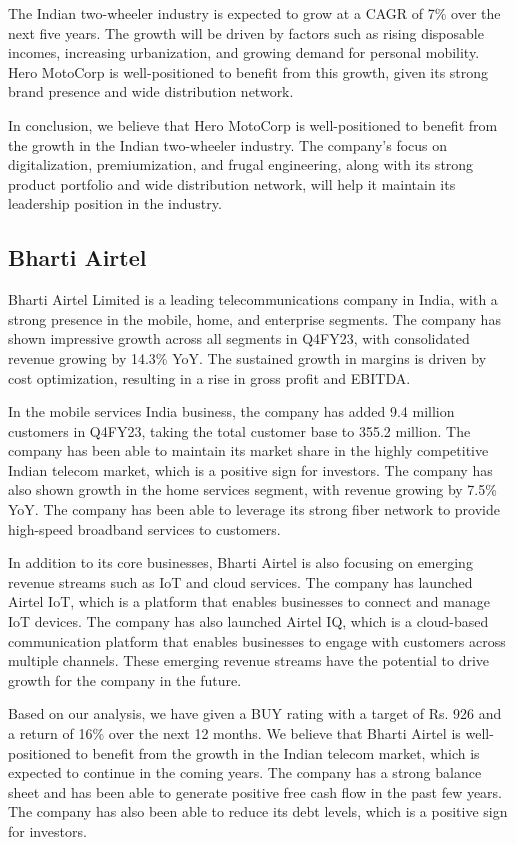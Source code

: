 The Indian two-wheeler industry is expected to grow at a CAGR of 7\% over the next five years. The growth will be driven by factors such as rising disposable incomes, increasing urbanization, and growing demand for personal mobility. Hero MotoCorp is well-positioned to benefit from this growth, given its strong brand presence and wide distribution network.

In conclusion, we believe that Hero MotoCorp is well-positioned to benefit from the growth in the Indian two-wheeler industry. The company's focus on digitalization, premiumization, and frugal engineering, along with its strong product portfolio and wide distribution network, will help it maintain its leadership position in the industry.

    \subsection{Bharti Airtel} Bharti Airtel Limited is a leading telecommunications company in India, with a strong presence in the mobile, home, and enterprise segments. The company has shown impressive growth across all segments in Q4FY23, with consolidated revenue growing by 14.3\% YoY. The sustained growth in margins is driven by cost optimization, resulting in a rise in gross profit and EBITDA.

In the mobile services India business, the company has added 9.4 million customers in Q4FY23, taking the total customer base to 355.2 million. The company has been able to maintain its market share in the highly competitive Indian telecom market, which is a positive sign for investors. The company has also shown growth in the home services segment, with revenue growing by 7.5\% YoY. The company has been able to leverage its strong fiber network to provide high-speed broadband services to customers.

In addition to its core businesses, Bharti Airtel is also focusing on emerging revenue streams such as IoT and cloud services. The company has launched Airtel IoT, which is a platform that enables businesses to connect and manage IoT devices. The company has also launched Airtel IQ, which is a cloud-based communication platform that enables businesses to engage with customers across multiple channels. These emerging revenue streams have the potential to drive growth for the company in the future.

Based on our analysis, we have given a BUY rating with a target of Rs. 926 and a return of 16\% over the next 12 months. We believe that Bharti Airtel is well-positioned to benefit from the growth in the Indian telecom market, which is expected to continue in the coming years. The company has a strong balance sheet and has been able to generate positive free cash flow in the past few years. The company has also been able to reduce its debt levels, which is a positive sign for investors.

